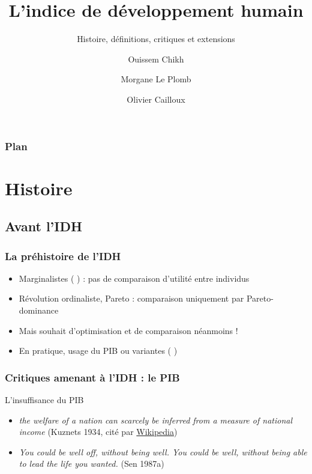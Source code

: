 \documentclass[french]{beamer}
\title[IDH]{L’indice de développement humain}
\subtitle{Histoire, définitions, critiques et extensions}
\author[Ouissem, Morgane, Olivier]{Ouissem Chikh \and Morgane Le Plomb \and Olivier Cailloux}
\institute[Éco du dev, L3]{Économie du développement, L3}
\date{\formatdate{30}{9}{2024}}
\begin{document}
\begin{frame}[plain]
	\titlepage
\end{frame}
\addtocounter{framenumber}{-1}

\begin{frame}
	\frametitle{Plan}
	\tableofcontents[hideallsubsections, sectionstyle=shaded/show]
\end{frame}


\section{Histoire}
\subsection{Avant l’IDH}
\begin{frame}
	\frametitle{La préhistoire de l’IDH}
  \begin{itemize}
    \item Marginalistes ( ) : pas de comparaison d’utilité entre individus
    \item Révolution \og{}ordinaliste\fg{}, Pareto : comparaison uniquement par Pareto-dominance
    \item Mais souhait d’optimisation et de comparaison néanmoins !
    \item En pratique, usage du PIB ou variantes ( )
  \end{itemize}
\end{frame}

\begin{frame}
	\frametitle{Critiques amenant à l’IDH : le PIB}
  \begin{block}{L’insuffisance du PIB}
    \begin{itemize}
      \item \emph{the welfare of a nation can scarcely be inferred from a measure of national income} {\small (Kuznets 1934, cité par \href{https://en.wikipedia.org/wiki/Simon_Kuznets\#National_income_accounts}{Wikipedia})} %
      \item \emph{You could be well off, without being well. You could be well, without being able to lead the life you wanted.} {\small (Sen 1987a)}%
    \end{itemize}
  \end{block}
\end{frame}
\end{document}
